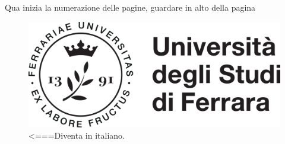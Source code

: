 \documentclass[a4paper, 12pt]{book}
\begin{document}
\pagestyle{empty}
\clearpage
\tableofcontents
\thispagestyle{empty}






\newpage
Qua inizia la numerazione delle pagine, guardare in alto della pagina

\begin{figure}[t]
\begin{center}
\includegraphics[scale=0.5]{./immagini/logo.png}
\end{center}
\caption{<===Diventa in italiano.}\label{fig:uni}
\end{figure}



\end{document}
